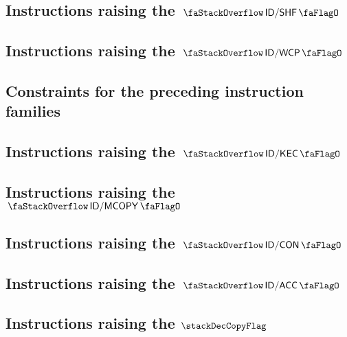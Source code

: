 \subsection{Instructions raising the $\stackDecShfFlag$           \lispDone{}}   \label{hub: instruction handling: shf}                    
\subsection{Instructions raising the $\stackDecWcpFlag$           \lispDone{}}   \label{hub: instruction handling: wcp}                    
\subsection{Constraints for the preceding instruction families    \lispDone{}}   \label{hub: instruction handling: stateless constraints}  
\subsection{Instructions raising the $\stackDecKecFlag$           \lispDone{}}   \label{hub: instruction handling: kec}                    
\subsection{Instructions raising the $\stackDecMcopyFlag$         \lispTodo{}}   \label{hub: instruction handling: mcopy}                  
\subsection{Instructions raising the $\stackDecConFlag$           \lispDone{}}   \label{hub: instruction handling: con}                    
\subsection{Instructions raising the $\stackDecAccFlag$           \lispDone{}}   \label{hub: instruction handling: acc}                    
\subsection{Instructions raising the $\stackDecCopyFlag$          \lispDone{}}   \label{hub: instruction handling: copy}                   
